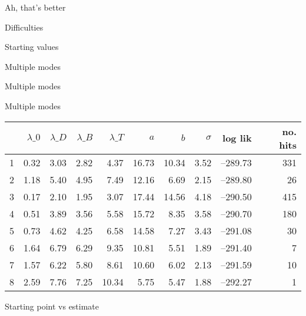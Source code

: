 \documentclass[aspectratio=169,12pt,t]{beamer}
\begin{document}
\begin{frame}{Ah, that's better}
\end{frame}


\begin{frame}{Difficulties}

\bbi
\item Starting values
\item Multiple modes
\ei

\end{frame}




\begin{frame}[c]{Multiple modes}
\end{frame}




\begin{frame}[c]{Multiple modes}

\centering
\renewcommand{\arraystretch}{1.3}
\begin{tabular}{rrrrrrrrrr}
  \hline
 & $\lambda\_0$ & $\lambda\_D$ & $\lambda\_B$ & $\lambda\_T$ & $a$ &
  $b$ & $\sigma$ & log lik & no. hits \\
  \hline
1 & 0.32 & 3.03 & 2.82 & 4.37 & 16.73 & 10.34 & 3.52 & --289.73 & 331 \\
  2 & 1.18 & 5.40 & 4.95 & 7.49 & 12.16 & 6.69 & 2.15 & --289.80 & 26 \\
  3 & 0.17 & 2.10 & 1.95 & 3.07 & 17.44 & 14.56 & 4.18 & --290.50 & 415 \\
  4 & 0.51 & 3.89 & 3.56 & 5.58 & 15.72 & 8.35 & 3.58 & --290.70 & 180 \\
  5 & 0.73 & 4.62 & 4.25 & 6.58 & 14.58 & 7.27 & 3.43 & --291.08 & 30 \\
  6 & 1.64 & 6.79 & 6.29 & 9.35 & 10.81 & 5.51 & 1.89 & --291.40 & 7 \\
  7 & 1.57 & 6.22 & 5.80 & 8.61 & 10.60 & 6.02 & 2.13 & --291.59 & 10 \\
  8 & 2.59 & 7.76 & 7.25 & 10.34 & 5.75 & 5.47 & 1.88 & --292.27 & 1 \\
   \hline
\end{tabular}

\end{frame}


\begin{frame}[c]{Starting point vs estimate}
\end{frame}
\end{document}
